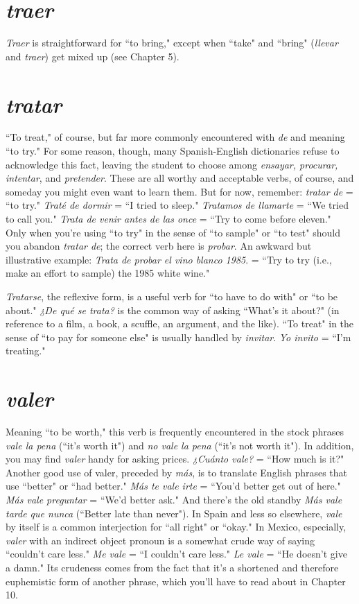 \section{\emph{traer}}

\emph{Traer} is straightforward for ``to bring," except when ``take"
and ``bring" (\emph{llevar} and \emph{traer}) get mixed up (see Chapter 5).

\section{\emph{tratar}}

``To treat," of course, but far more commonly encountered
with \emph{de} and meaning ``to try." For some reason, though, many Spanish-English dictionaries refuse to acknowledge this fact, leaving the student to choose among \emph{ensayar, procurar, intentar}, and \emph{pretender}.
These are all worthy and acceptable verbs, of course, and someday you
might even want to learn them. But for now, remember: \emph{tratar de} =
``to try." \emph{Traté de dormir} = ``I tried to sleep." \emph{Tratamos de llamarte}
= ``We tried to call you." \emph{Trata de venir antes de las once} = ``Try to
come before eleven." Only when you're using ``to try" in the sense of
``to sample" or ``to test" should you abandon \emph{tratar de}; the correct verb
here is \emph{probar}. An awkward but illustrative example: \emph{Trata de probar
el vino blanco 1985}. = ``Try to try (i.e., make an effort to sample) the
1985 white wine."

\emph{Tratarse}, the reflexive form, is a useful verb for ``to have to do
with" or ``to be about." \emph{¿De qué se trata?} is the common way of asking
``What's it about?" (in reference to a film, a book, a scuffle, an argument, and the like). ``To treat" in the sense of ``to pay for someone
else" is usually handled by \emph{invitar}. \emph{Yo invito} = ``I'm treating."

\section{\emph{valer}}

Meaning ``to be worth," this verb is frequently encountered
in the stock phrases \emph{vale la pena} (``it's worth it") and \emph{no vale la pena}
(``it's not worth it"). In addition, you may find \emph{valer} handy for asking
prices. \emph{¿Cuánto vale?} = ``How much is it?" Another good use of valer,
preceded by \emph{más}, is to translate English phrases that use ``better" or
``had better." \emph{Más te vale irte} = ``You'd better get out of here." \emph{Más
vale preguntar} = ``We'd better ask." And there's the old standby \emph{Más
vale tarde que nunca} (``Better late than never"). In Spain and less so
elsewhere, \emph{vale} by itself is a common interjection for ``all right" or
``okay." In Mexico, especially, \emph{valer} with an indirect object pronoun
is a somewhat crude way of saying ``couldn't care less." \emph{Me vale} = ``I
couldn't care less." \emph{Le vale} = ``He doesn't give a damn." Its crudeness
comes from the fact that it's a shortened and therefore euphemistic
form of another phrase, which you'll have to read about in Chapter 10.

